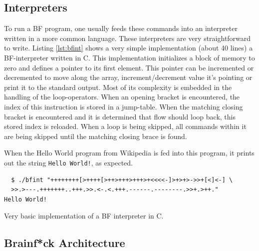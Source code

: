 \subsection{Interpreters}
To run a BF program, one usually feeds these commands into an interpreter written in a more common language. These interpreters are very straightforward to write. Listing \ref{lst:bfint} shows a very simple implementation (about 40 lines) a BF-interpreter written in C. This implementation initializes a block of memory to zero and defines a pointer to its first element. This pointer can be incremented or decremented to move along the array, increment/decrement value it's pointing or print it to the standard output. Most of its complexity is embedded in the handling of the loop-operators. When an opening bracket is encountered, the index of this instruction is stored in a jump-table. When the matching closing bracket is encountered and it is determined that flow should loop back, this stored index is reloaded. When a loop is being skipped, all commands within it are being skipped until the matching closing brace is found.

When the Hello World program from Wikipedia \cite{bfwiki} is fed into this program, it prints out the string \texttt{Hello World!}, as expected.
\vspace{1cm}
\begin{lstlisting}
  $ ./bfint "++++++++[>++++[>++>+++>+++>+<<<<-]>+>+>->>+[<]<-] \
  >>.>---.+++++++..+++.>>.<-.<.+++.------.--------.>>+.>++."
Hello World!
\end{lstlisting}


\begin{lstfloat}[H]
    
\caption{Very basic implementation of a BF interpreter in C.}
\label{lst:bfint}
\end{lstfloat}



\subsection{Brainf*ck Architecture}
